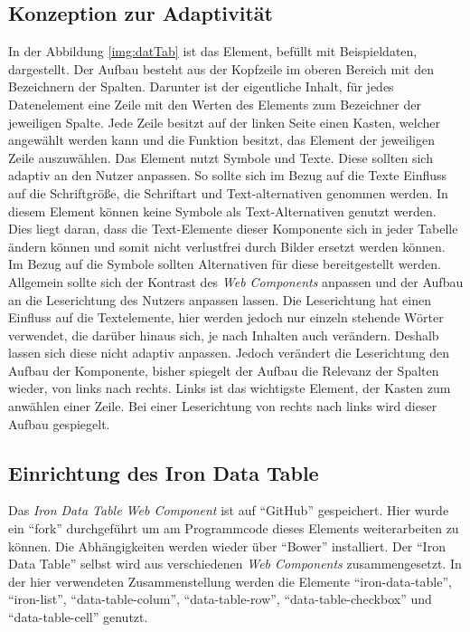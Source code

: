 \documentclass[12pt, paper=a4, bibtotoc, toc=listof, headsepline=true]{scrreprt}
\begin{document}
		\subsection{Konzeption zur Adaptivität}
		\label{sec:konZurAda}
		In der Abbildung \ref{img:datTab} ist das Element, befüllt mit Beispieldaten, dargestellt. Der Aufbau besteht aus der Kopfzeile im oberen Bereich mit den Bezeichnern der Spalten. Darunter ist der eigentliche Inhalt, für jedes Datenelement eine Zeile mit den Werten des Elements zum Bezeichner der jeweiligen Spalte. Jede Zeile besitzt auf der linken Seite einen Kasten, welcher angewählt werden kann und die Funktion besitzt, das Element der jeweiligen Zeile auszuwählen.
		\newline
		Das Element nutzt Symbole und Texte. Diese sollten sich adaptiv an den Nutzer anpassen. So sollte sich im Bezug auf die Texte Einfluss auf die Schriftgröße, die Schriftart und Text-alternativen genommen werden. In diesem Element können keine Symbole als Text-Alternativen genutzt werden. Dies liegt daran, dass die Text-Elemente dieser Komponente sich in jeder Tabelle ändern können und somit nicht verlustfrei durch Bilder ersetzt werden können. Im Bezug auf die Symbole sollten Alternativen für diese bereitgestellt werden. Allgemein sollte sich der Kontrast des \emph{Web Components} anpassen und der Aufbau an die Leserichtung des Nutzers anpassen lassen. Die Leserichtung hat einen Einfluss auf die Textelemente, hier werden jedoch nur einzeln stehende Wörter verwendet, die darüber hinaus sich, je nach Inhalten auch verändern. Deshalb lassen sich diese nicht adaptiv anpassen. Jedoch verändert die Leserichtung den Aufbau der Komponente, bisher spiegelt der Aufbau die Relevanz der Spalten wieder, von links nach rechts. Links ist das wichtigste Element, der Kasten zum anwählen einer Zeile. Bei einer Leserichtung von rechts nach links wird dieser Aufbau gespiegelt.  
		\subsection{Einrichtung des Iron Data Table}
		Das \emph{Iron Data Table Web Component} ist auf \enquote{GitHub} gespeichert. Hier wurde ein \enquote{fork} durchgeführt um am Programmcode dieses Elements weiterarbeiten zu können. Die Abhängigkeiten werden wieder über \enquote{Bower} installiert. Der \enquote{Iron Data Table} selbst wird aus verschiedenen \emph{Web Components} zusammengesetzt. In der hier verwendeten Zusammenstellung werden die Elemente \enquote{iron-data-table}, \enquote{iron-list}, \enquote{data-table-colum}, \enquote{data-table-row}, \enquote{data-table-checkbox} und \enquote{data-table-cell}  genutzt.  
\end{document}
